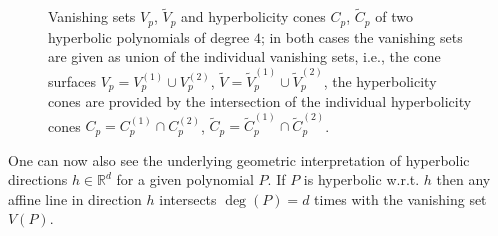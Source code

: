 \begin{figure}
\begin{minipage}{0.45\textwidth}
\begin{center}
\end{center}
\end{minipage}
    \caption[Hyperbolic Polynomials of Degree $4$.]{Vanishing sets $V_p$, $\widetilde{V}_p$ and hyperbolicity cones $C_p$, $\widetilde{C}_p$ of two hyperbolic polynomials of degree $4$; in both cases the vanishing sets are given as union of the individual vanishing sets, i.e., the cone surfaces $V_p = V_p^{(1)} \cup V_p^{(2)}$, $\widetilde{V} = \widetilde{V}_p^{(1)} \cup \widetilde{V}_p^{(2)}$, the hyperbolicity cones are provided by the intersection of the individual hyperbolicity cones $C_p = C_p^{(1)} \cap C_p^{(2)}$,  $\widetilde{C}_p = \widetilde{C}_p^{(1)} \cap \widetilde{C}_p^{(2)}$.}
    \label{Poly}
\end{figure}
One can now also see the underlying geometric interpretation of  hyperbolic directions  $h\in \mathbb{R}^d$ for a given polynomial $P$. If $P$ is hyperbolic w.r.t. $h$ then any affine line in direction $h$ intersects $\operatorname{deg}(P) = d$ times with the vanishing set $V(P)$.

